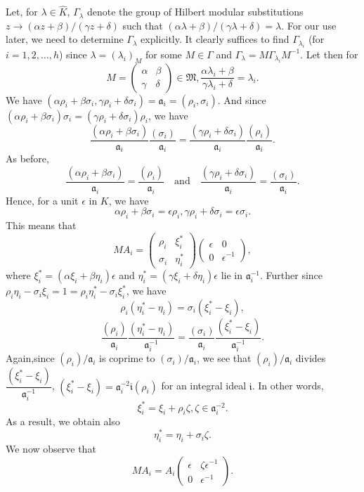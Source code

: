Let, for $\lambda\in\hat{K}$, $\Gamma_{\lambda}$ denote the group
of Hilbert modular substitutions $z\to (\alpha z+\beta)/(\gamma
z+\delta)$ such that
$(\alpha\lambda+\beta)/(\gamma\lambda+\delta)=\lambda$. For our use
later, we need to determine $\Gamma_{\lambda}$ explicitly. It clearly
suffices to find $\Gamma_{\lambda_{i}}$ (for $i=1,2,\ldots,h$) since
$\lambda=(\lambda_{i})_{M}$ for some $M\in\Gamma$ and
$\Gamma_{\lambda}=M\Gamma_{\lambda_{i}}M^{-1}$. Let then for
$$
M=
\begin{pmatrix}
\alpha & \beta\\
\gamma & \delta
\end{pmatrix}
\in\mathfrak{M},
\frac{\alpha\lambda_{i}+\beta}{\gamma\lambda_{i}+\delta}=\lambda_{i}. 
$$
We have
$(\alpha\rho_{i}+\beta\sigma_{i},\gamma\rho_{i}+\delta\sigma_{i})=\mathfrak{a}_{i}=(\rho_{i},\sigma_{i})$. And
since
$(\alpha\rho_{i}+\beta\sigma_{i})\sigma_{i}=(\gamma\rho_{i}+\delta\sigma_{i})\rho_{i}$,
we have
$$
\frac{(\alpha\rho_{i}+\beta\sigma_{i})}{\mathfrak{a}_{i}}\frac{(\sigma_{i})}{\mathfrak{a}_{i}}=\frac{(\gamma\rho_{i}+\delta\sigma_{i})}{\mathfrak{a}_{i}}\frac{(\rho_{i})}{\mathfrak{a}_{i}}. 
$$
As before,
$$
\frac{(\alpha\rho_{i}+\beta\sigma_{i})}{\mathfrak{a}_{i}}=\frac{(\rho_{i})}{\mathfrak{a}_{i}}\quad\text{and}\quad
\frac{(\gamma\rho_{i}+\delta\sigma_{i})}{\mathfrak{a}_{i}}=\frac{(\sigma_{i})}{\mathfrak{a}_{i}}. 
$$
Hence, for a unit $\epsilon$ in $K$, we have
$$
\alpha\rho_{i}+\beta\sigma_{i}=\epsilon\rho_{i},\gamma\rho_{i}+\delta\sigma_{i}=\epsilon\sigma_{i}.
$$
This means that
$$
MA_{i}=
\begin{pmatrix}
\rho_{i} & \xi^{\ast}_{i}\\
\sigma_{i} & \eta^{\ast}_{i}
\end{pmatrix}
\begin{pmatrix}
\epsilon & 0\\
0 & \epsilon^{-1}
\end{pmatrix},
$$
where $\xi^{\ast}_{i}=(\alpha\xi_{i}+\beta\eta_{i})\epsilon$ and
$\eta^{\ast}_{i}=(\gamma\xi_{i}+\delta\eta_{i})\epsilon$ lie in
$\mathfrak{a}^{-1}_{i}$. Further since
$\rho_{i}\eta_{i}-\sigma_{i}\xi_{i}=1=\rho_{i}\eta^{\ast}_{i}-\sigma_{i}\xi^{\ast}_{i}$,
we have
$$
\rho_{i}(\eta^{\ast}_{i}-\eta_{i})=\sigma_{i}(\xi^{\ast}_{i}-\xi_{i}),
$$
\ie
$$
\frac{(\rho_{i})}{\mathfrak{a}_{i}}\frac{(\eta^{\ast}_{i}-\eta_{i})}{\mathfrak{a}^{-1}_{i}}=\frac{(\sigma_{i})}{\mathfrak{a}_{i}}\frac{(\xi^{\ast}_{i}-\xi_{i})}{\mathfrak{a}^{-1}_{i}}. 
$$
Again,\pageoriginale since $(\rho_{i})/\mathfrak{a}_{i}$ is coprime to
$(\sigma_{i})/\mathfrak{a}_{i}$, we see that
$(\rho_{i})/\mathfrak{a}_{i}$ divides
$\dfrac{(\xi^{\ast}_{i}-\xi_{i})}{\mathfrak{a}^{-1}_{i}}$, \ie
$(\xi^{\ast}_{i}-\xi_{i})=\mathfrak{a}^{-2}_{i}\mathfrak{i}(\rho_{i})$ for an
integral ideal $\mathfrak{i}$. In other words,
$$
\xi^{\ast}_{i}=\xi_{i}+\rho_{i}\zeta, \zeta\in \mathfrak{a}^{-2}_{i}.
$$
As a result, we obtain also
$$
\eta^{\ast}_{i}=\eta_{i}+\sigma_{i}\zeta.
$$
We now observe that
$$
MA_{i}=A_{i}
\begin{pmatrix}
\epsilon & \zeta\epsilon^{-1}\\
0 & \epsilon^{-1}
\end{pmatrix}.
$$

